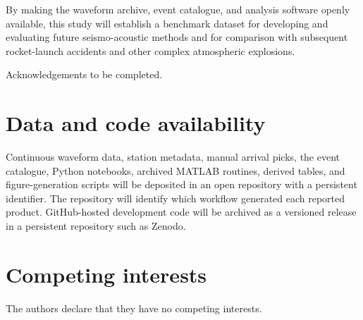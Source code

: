\documentclass[]{seismica}
\begin{document}
By making the waveform archive, event catalogue, and analysis software openly available, this study will establish a benchmark dataset for developing and evaluating future seismo-acoustic methods and for comparison with subsequent rocket-launch accidents and other complex atmospheric explosions.

\begin{acknowledgements}
Acknowledgements to be completed.
\end{acknowledgements}

\section*{Data and code availability}

Continuous waveform data, station metadata, manual arrival picks, the event catalogue, Python notebooks, archived MATLAB routines, derived tables, and figure-generation scripts will be deposited in an open repository with a persistent identifier. The repository will identify which workflow generated each reported product. GitHub-hosted development code will be archived as a versioned release in a persistent repository such as Zenodo.

\section*{Competing interests}

The authors declare that they have no competing interests.


\end{document}
